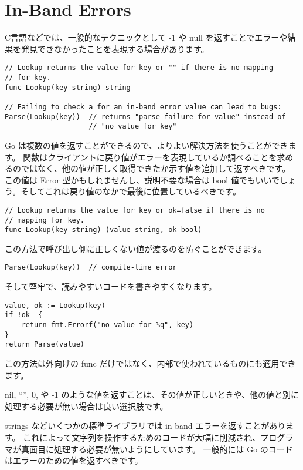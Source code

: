 \section{In-Band Errors}

C言語などでは、一般的なテクニックとして -1 や null を返すことでエラーや結果を発見できなかったことを表現する場合があります。

\begin{lstlisting}[]
// Lookup returns the value for key or "" if there is no mapping
// for key.
func Lookup(key string) string

// Failing to check a for an in-band error value can lead to bugs:
Parse(Lookup(key))  // returns "parse failure for value" instead of
                    // "no value for key"
\end{lstlisting}

Go は複数の値を返すことができるので、よりよい解決方法を使うことができます。 関数はクライアントに戻り値がエラーを表現しているか調べることを求めるのではなく、他の値が正しく取得できたか示す値を追加して返すべきです。 この値は Error 型かもしれませんし、説明不要な場合は bool 値でもいいでしょう。そしてこれは戻り値のなかで最後に位置しているべきです。

\begin{lstlisting}[]
// Lookup returns the value for key or ok=false if there is no
// mapping for key.
func Lookup(key string) (value string, ok bool)
\end{lstlisting}

この方法で呼び出し側に正しくない値が渡るのを防ぐことができます。

\begin{lstlisting}[]
Parse(Lookup(key))  // compile-time error
\end{lstlisting}

そして堅牢で、読みやすいコードを書きやすくなります。

\begin{lstlisting}[]
value, ok := Lookup(key)
if !ok  {
    return fmt.Errorf("no value for %q", key)
}
return Parse(value)
\end{lstlisting}

この方法は外向けの func だけではなく、内部で使われているものにも適用できます。

nil, “”, 0, や -1 のような値を返すことは、その値が正しいときや、他の値と別に処理する必要が無い場合は良い選択肢です。

strings などいくつかの標準ライブラリでは in-band エラーを返すことがあります。 これによって文字列を操作するためのコードが大幅に削減され、プログラマが真面目に処理する必要が無いようにしています。 一般的には Go のコードはエラーのための値を返すべきです。

